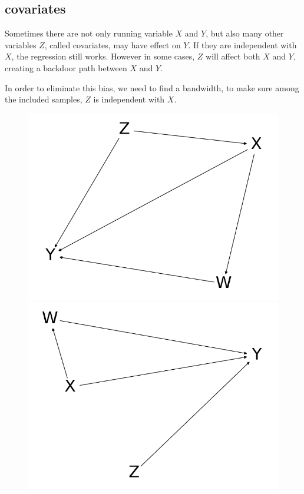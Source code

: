 \documentclass[a4 paper,12pt]{article}
\begin{document}
\subsection*{covariates}
Sometimes there are not only running variable $X$ and $Y$, but also many other variables $Z$, called covariates, may have effect on $Y$. If they are independent with $X$, the regression still works. However in some cases, $Z$ will affect both $X$ and $Y$, creating a backdoor path between $X$ and $Y$. 

In order to eliminate this bias, we need to find a bandwidth, to make sure among the included samples, $Z$ is independent with $X$.

\begin{figure}[h]
	\centering
	\includegraphics[scale=0.5]{Figure_3.png}
	\includegraphics[scale=0.5]{Figure_4.png}
\end{figure}
\end{document}
